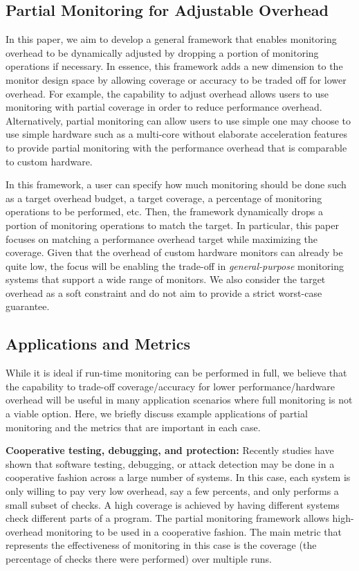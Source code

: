 \subsection{Partial Monitoring for Adjustable Overhead}

In this paper, we aim to develop a general framework that enables monitoring
overhead to be dynamically adjusted by dropping a portion of monitoring 
operations if necessary. In essence, this framework adds a new dimension to
the monitor design space by allowing coverage or accuracy to be traded off
for lower overhead. For example, the capability to adjust overhead allows users
to use monitoring with partial coverage in order to reduce performance
overhead. Alternatively, partial monitoring can allow users to use simple
one may choose to use simple hardware such as a
multi-core without elaborate acceleration features to provide partial monitoring
with the performance overhead that is comparable to custom hardware.

In this framework, a user can specify how much monitoring should be done such as a target 
overhead budget, a target coverage, a percentage of monitoring operations to be performed, etc.
Then, the framework dynamically drops a portion of monitoring operations to match
the target. In particular, this paper focuses on matching a performance overhead target
while maximizing the coverage. Given that the overhead of custom hardware monitors can
already be quite low, the focus will be enabling the trade-off in {\em general-purpose} 
monitoring systems that support a wide range of monitors.
We also consider the target overhead as a soft constraint and do not aim to
provide a strict worst-case guarantee.

\subsection{Applications and Metrics}

While it is ideal if run-time monitoring can be performed in full, we believe that
the capability to trade-off coverage/accuracy for lower performance/hardware overhead
will be useful in many application scenarios where full monitoring is not a viable option.
Here, we briefly discuss example applications of partial monitoring and the metrics
that are important in each case.

{\bf Cooperative testing, debugging, and protection:}
Recently studies \cite{FIXME} have shown that software testing, debugging,
or attack detection may be done in a cooperative fashion across
a large number of systems. In this case, each system is only willing to pay very low
overhead, say a few percents, and only performs a small subset of checks. 
A high coverage is achieved by having different systems check different parts of a program.
The partial monitoring framework allows high-overhead monitoring to be used in a
cooperative fashion. 
The main metric that represents the effectiveness of monitoring in this case is
the coverage (the percentage of checks there were performed) over multiple runs.

